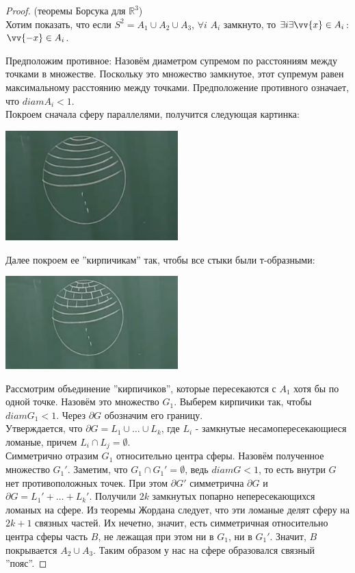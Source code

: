 \begin{proof}(теоремы Борсука для $\mathbb{R}^3$)\\
Хотим показать, что если $S^2 = A_1 \cup A_2 \cup A_3$, $\forall i$ $A_i$ замкнуто, то $\exists i \exists \vv{x} \in A_i$: $\vv{-x} \in A_i$. 

Предположим противное: Назовём диаметром супремом по расстояниям между точками в множестве. Поскольку это множество замкнутое, этот супремум равен максимальному расстоянию между точками. Предположение противного означает, что $diamA_i < 1$. \\
Покроем сначала сферу параллелями, получится следующая картинка:

\includegraphics[width=0.5\textwidth]{images/lecture15_sphere1.png}

Далее покроем ее ''кирпичикам'' так, чтобы все стыки были т-образными:

\includegraphics[width=0.5\textwidth]{images/lecture15_sphere2.png}

Рассмотрим объединение ''кирпичиков'', которые пересекаются с $A_1$ хотя бы по одной точке. Назовём это множество $G_1$.
Выберем кирпичики так, чтобы $diamG_1 < 1$. Через $\partial G$ обозначим его границу.\\
Утверждается, что $\partial G = L_1 \cup \dots \cup L_k$, где $L_i$ - замкнутые несамопересекающиеся ломаные, причем $L_i \cap L_j = \emptyset$.\\
Симметрично отразим $G_1$ относительно центра сферы. Назовём полученное множество $G_1'$. Заметим, что $G_1 \cap G_1' = \emptyset$, ведь $diamG <1$, то есть внутри $G$ нет противоположных точек. При этом $\partial G'$ симметрична $\partial G$ и $\partial G = L_1'+\dots+L_k'.$ Получили $2k$ замкнутых попарно непересекающихся ломаных на сфере. Из теоремы Жордана следует, что эти ломаные делят сферу на $2k+1$ связных частей. Их нечетно, значит, есть симметричная относительно центра сферы часть $B$, не лежащая при этом ни в $G_1$, ни в $G_1'$. Значит, $B$ покрывается $A_2 \cup A_3$. Таким образом у нас на сфере образовался связный ''пояс''. 


\end{proof}
